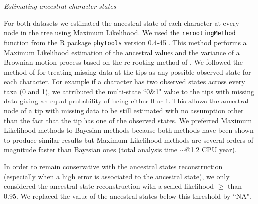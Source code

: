 \documentclass[12pt,letterpaper]{article}
\renewcommand{\subsection}[1]{%
\bigskip
\begin{center}
\begin{large}
\normalfont\itshape #1
\end{large}
\end{center}}
\begin{document}
\subsection{Estimating ancestral character states}
For both datasets we estimated the ancestral state of each character at every node in the tree using Maximum Likelihood.
We used the \texttt{rerootingMethod} function from the R package \texttt{phytools} version 0.4-45 \citep{phytools,R}.
This method performs a Maximum Likelihood estimation of the ancestral values and the variance of a Brownian motion process based on the re-rooting method of \citealt{Yang01121995}.
We followed the method of \cite{Claddis} for treating missing data at the tips as any possible observed state for each character.
For example if a character has two observed states across every taxa (0 and 1), we attributed the multi-state ``0\&1" value to the tips with missing data giving an equal probability of being either 0 or 1.
This allows the ancestral node of a tip with missing data to be still estimated with no assumption other than the fact that the tip has one of the observed states.
We preferred Maximum Likelihood methods to Bayesian methods because both methods have been shown to produce similar results \citep{royer-carenzichoosing2013} but Maximum Likelihood methods are several orders of magnitude faster than Bayesian ones (total analysis time $\sim$@1.2 CPU year). 

In order to remain conservative with the ancestral states reconstruction (especially when a high error is associated to the ancestral state), we only considered the ancestral state reconstruction with a scaled likelihood $\geq$ than 0.95.
We replaced the value of the ancestral states below this threshold by ``NA".
\end{document}
